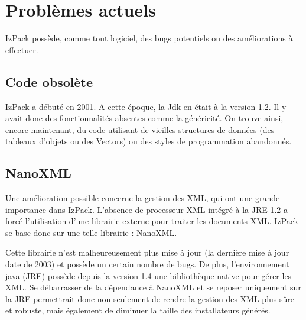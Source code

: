 \section{Problèmes actuels}
IzPack possède, comme tout logiciel, des bugs potentiels ou des améliorations à effectuer.

\subsection{Code obsolète}
IzPack a débuté en 2001.
A cette époque, la Jdk en était à la version 1.2. Il y avait donc des fonctionnalités absentes comme la généricité.
On trouve ainsi, encore maintenant, du code utilisant de vieilles structures de données (des tableaux d'objets ou des Vectors) ou des styles de programmation abandonnés.

\subsection{NanoXML}
Une amélioration possible concerne la gestion des XML, qui ont une grande importance dans IzPack.
L'absence de processeur XML intégré à la JRE 1.2 a forcé l'utilisation d'une librairie externe pour traiter les documents XML.
IzPack se base donc sur une telle librairie : NanoXML.

Cette librairie n'est malheureusement plus mise à jour (la dernière mise à jour date de 2003) et possède un certain nombre de bugs.
De plus, l'environnement java (JRE) possède depuis la version 1.4 une bibliothèque native pour gérer les XML.
Se débarrasser de la dépendance à NanoXML et se reposer uniquement sur la JRE permettrait donc non seulement de rendre la gestion des XML plus sûre et robuste, mais également de diminuer la taille des installateurs générés.